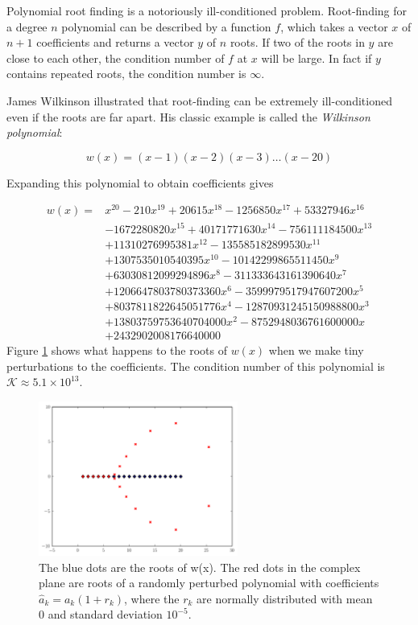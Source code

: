 \begin{example}
Polynomial root finding is a notoriously ill-conditioned problem. Root-finding for a degree $n$ polynomial can be described by a function $f$, which takes a vector $x$ of $n+1$ coefficients and returns a vector $y$ of $n$ roots. If two of the roots in $y$ are close to each other, the condition number of $f$ at $x$ will be large. In fact if $y$ contains repeated roots, the condition number is $\infty$.
 
James Wilkinson illustrated that root-finding can be extremely ill-conditioned even if the roots are far apart. His classic example is called the \emph{Wilkinson polynomial}:
 
\[
w(x) = (x-1)(x-2)(x-3)\hdots(x-20)
\]
 
Expanding this polynomial to obtain coefficients gives
 
\[\begin{array}{cl}
 w(x)=& x^{20}-210x^{19} +20615x^{18} -1256850 x^{17} +53327946 x^{16}\\ 
 &-1672280820x^{15} + 40171771630x^{14} -756111184500x^{13}\\
&+11310276995381 x^{12} -135585182899530 x^{11}\\ 
&+1307535010540395 x^{10} -10142299865511450 x^9\\
&+63030812099294896 x^8 -311333643161390640 x^7\\ 
&+1206647803780373360 x^6 -3599979517947607200 x^5\\ 
&+8037811822645051776 x^4 -12870931245150988800 x^3\\
& +13803759753640704000 x^2 -8752948036761600000 x\\
& +2432902008176640000
      \end{array} \]
Figure \ref{fig:wilkinsonpolynomial} shows what happens to the roots of $w(x)$ when we make tiny perturbations to the coefficients. The condition number of this polynomial is $\mathcal{K} \approx 5.1 \times 10^{13}$.

\begin{figure}
\centering
\includegraphics[height=2in]{wilkinsonpolynomial.pdf}
\caption{The blue dots are the roots of w(x). The red dots in the complex plane are roots of a randomly perturbed polynomial with coefficients $\hat{a}_k = a_k(1+r_k)$, where the $r_k$ are normally distributed with mean $0$ and standard deviation $10^{-5}$.}
\label{fig:wilkinsonpolynomial}
\end{figure}
\end{example}


